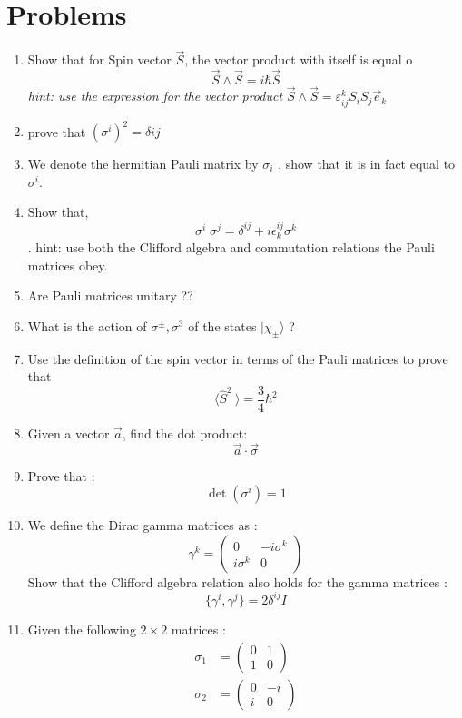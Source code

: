 \section{Problems}
\begin{enumerate}
	\item Show that for Spin vector $ \vec S$, the  vector product with itself is equal o
	\[ \vec S \wedge \vec S = i \hbar \vec S \]
	\textit{hint: use the expression for the vector product} $ \vec S \wedge \vec S  = \varepsilon _{ij} ^k S_i S_j \vec e_k $
	\item prove that $ ( \sigma ^i)^2 = \delta{ij}$
	\item We denote the hermitian Pauli matrix by $  \sigma_i$ , show that it is in fact equal to $ \sigma ^i$. 
	\item Show that, $$ \sigma ^i \; \sigma^j = \delta ^{ij} + i \epsilon_k ^{ij} \sigma ^k$$.
	hint: use both the Clifford algebra and commutation relations the Pauli matrices obey.
	\item Are Pauli matrices unitary ??
	\item What is the action of $ \sigma ^\pm , \sigma ^3$ of the states $ | \chi_\pm\rangle$ ?
	\item Use the definition of the spin vector in terms of the Pauli matrices to prove that $$ \langle \hat S ^2 \ \rangle = \frac{3}{4} \hbar^2$$
	\item Given a vector $ \vec a$, find the dot product: $$ \vec a \cdot \vec \sigma $$ 
	\item Prove that :
	\[ \det ( \sigma ^i) =1 \]
	\item We define the Dirac gamma matrices as :
	\[ \gamma ^k = \begin{pmatrix}
	0&-i\sigma ^k\\i\sigma^k&0
	\end{pmatrix} \]
	Show that the Clifford algebra relation also holds for the gamma matrices :
	\[ \{ \gamma^i, \gamma^j\} = 2 \delta ^{ij} I \]
	\item Given the following $ 2 \times 2$ matrices :
	\begin{align*}
	\sigma_1   &=
	\begin{pmatrix}
	0&1\\
	1&0
	\end{pmatrix} \\
	\sigma_2   &=
	\begin{pmatrix}
	0&-i\\
	i&0
	\end{pmatrix} \\

\end{align*}
\end{enumerate}
